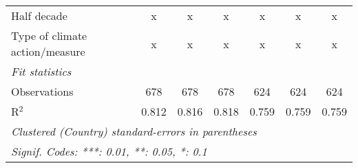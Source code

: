 \begin{tabular}{lcccccc}
   Half decade                                          & x       & x             & x             & x             & x             & x\\  
   Type of climate action/measure                       & x       & x             & x             & x             & x             & x\\  
   \midrule \emph{Fit statistics}\\
   Observations                                         & 678     & 678           & 678           & 624           & 624           & 624\\  
   R$^2$                                                & 0.812   & 0.816         & 0.818         & 0.759         & 0.759         & 0.759\\  
   \midrule
   \multicolumn{7}{l}{\emph{Clustered (Country) standard-errors in parentheses}}\\
   \multicolumn{7}{l}{\emph{Signif. Codes: ***: 0.01, **: 0.05, *: 0.1}}\\
\end{tabular}
\par\endgroup


